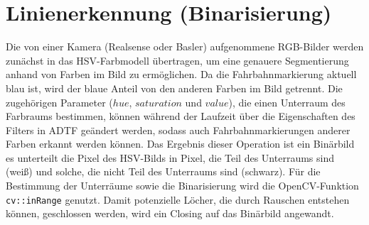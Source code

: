 \documentclass[a4paper,12pt]{report}
\begin{document}
\section{Linienerkennung (Binarisierung)}
	Die von einer Kamera (Realsense oder Basler) aufgenommene RGB-Bilder werden zunächst in das HSV-Farbmodell übertragen, um eine genauere Segmentierung anhand von Farben im Bild zu ermöglichen.
	Da die Fahrbahnmarkierung aktuell blau ist, wird der blaue Anteil von den anderen Farben im Bild getrennt. Die zugehörigen Parameter ($hue$, $saturation$ und $value$), die einen Unterraum des Farbraums bestimmen, können während der Laufzeit über die Eigenschaften des Filters in ADTF geändert werden, sodass auch Fahrbahnmarkierungen anderer Farben erkannt werden können.
	Das Ergebnis dieser Operation ist ein Binärbild es unterteilt die Pixel des HSV-Bilds in Pixel, die Teil des Unterraums sind (weiß) und solche, die nicht Teil des Unterraums sind (schwarz). Für die Bestimmung der Unterräume sowie die Binarisierung wird die OpenCV-Funktion \texttt{cv::inRange} genutzt.
	Damit potenzielle Löcher, die durch Rauschen entstehen können, geschlossen werden, wird ein Closing auf das Binärbild angewandt.
\end{document}
